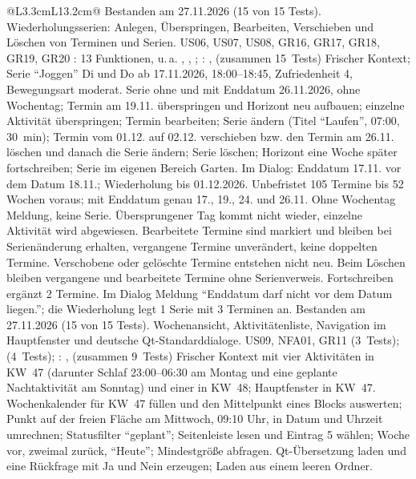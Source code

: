 \begin{longtable}{@{}L{3.3cm}L{13.2cm}@{}}
    {Bestanden am 27.11.2026 (15 von 15 Tests).}
  \midrule
    {Wiederholungsserien: Anlegen, Überspringen, Bearbeiten, Verschieben und Löschen von Terminen und Serien.}
    {US06, US07, US08, GR16, GR17, GR18, GR19, GR20}
    {: 13 Funktionen, u.\,a. , , ; : ,  (zusammen 15~Tests)}
    {Frischer Kontext; Serie \enquote{Joggen} Di und Do ab 17.11.2026, 18:00--18:45, Zufriedenheit 4, Bewegungsart moderat.}
    {Serie ohne und mit Enddatum 26.11.2026, ohne Wochentag; Termin am 19.11. überspringen und Horizont neu aufbauen; einzelne Aktivität überspringen; Termin bearbeiten; Serie ändern (Titel \enquote{Laufen}, 07:00, 30~min); Termin vom 01.12. auf 02.12. verschieben bzw. den Termin am 26.11. löschen und danach die Serie ändern; Serie löschen; Horizont eine Woche später fortschreiben; Serie im eigenen Bereich Garten. Im Dialog: Enddatum 17.11. vor dem Datum 18.11.; Wiederholung bis 01.12.2026.}
    {Unbefristet 105 Termine bis 52 Wochen voraus; mit Enddatum genau 17., 19., 24. und 26.11. Ohne Wochentag Meldung, keine Serie. Übersprungener Tag kommt nicht wieder, einzelne Aktivität wird abgewiesen. Bearbeitete Termine sind markiert und bleiben bei Serienänderung erhalten, vergangene Termine unverändert, keine doppelten Termine. Verschobene oder gelöschte Termine entstehen nicht neu. Beim Löschen bleiben vergangene und bearbeitete Termine ohne Serienverweis. Fortschreiben ergänzt 2 Termine. Im Dialog Meldung \enquote{Enddatum darf nicht vor dem Datum liegen.}; die Wiederholung legt 1 Serie mit 3 Terminen an.}
    {Bestanden am 27.11.2026 (15 von 15 Tests).}
  \midrule
    {Wochenansicht, Aktivitätenliste, Navigation im Hauptfenster und deutsche Qt-Standarddialoge.}
    {US09, NFA01, GR11}
    { (3~Tests);  (4~Tests); : ,  (zusammen 9~Tests)}
    {Frischer Kontext mit vier Aktivitäten in KW~47 (darunter Schlaf 23:00--06:30 am Montag und eine geplante Nachtaktivität am Sonntag) und einer in KW~48; Hauptfenster in KW~47.}
    {Wochenkalender für KW~47 füllen und den Mittelpunkt eines Blocks auswerten; Punkt auf der freien Fläche am Mittwoch, 09:10 Uhr, in Datum und Uhrzeit umrechnen; Statusfilter \enquote{geplant}; Seitenleiste lesen und Eintrag 5 wählen; Woche vor, zweimal zurück, \enquote{Heute}; Mindestgröße abfragen. Qt-Übersetzung laden und eine Rückfrage mit Ja und Nein erzeugen; Laden aus einem leeren Ordner.}

\end{longtable}
